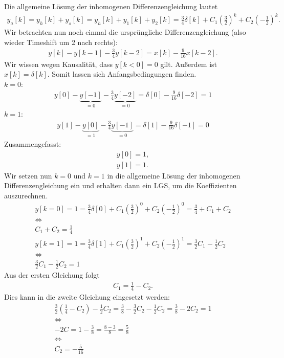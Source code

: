 \documentclass[11pt,a4paper,DIV=12]{scrartcl}
\begin{document}
Die allgemeine Lösung der inhomogenen Differenzengleichung lautet
\begin{gather}
	y_a[k]=y_h[k]+y_s[k]=y_h[k]+y_1[k]+y_2[k]=\frac{3}{4}\delta[k]+C_1\left(\frac{3}{2}\right)^k+C_2\left(-\frac{1}{2}\right)^k.
\end{gather}
Wir betrachten nun noch einmal die ursprüngliche Differenzengleichung (also wieder Timeshift um 2 nach rechts):
\begin{gather}
	y[k]-y[k-1]-\frac{3}{4}y[k-2]=x[k]-\frac{9}{16}x[k-2].
\end{gather}
Wir wissen wegen Kausalität, dass $y[k<0]=0$ gilt. Außerdem ist $x[k]=\delta[k]$. Somit lassen sich Anfangsbedingungen finden.\\
$k=0$:
\begin{gather}
	y[0]-\underbrace{y[-1]}_{=0}-\frac{3}{4}\underbrace{y[-2]}_{=0}=\delta[0]-\frac{9}{16}\delta[-2]=1
\end{gather}
$k=1$:
\begin{gather}
	y[1]-\underbrace{y[0]}_{=1}-\frac{3}{4}\underbrace{y[-1]}_{=0}=\delta[1]-\frac{9}{16}\delta[-1]=0
\end{gather}
Zusammengefasst:
\begin{gather}
	y[0]=1,\\
	y[1]=1.
\end{gather}
Wir setzen nun $k=0$ und $k=1$ in die allgemeine Lösung der inhomogenen Differenzengleichung ein und erhalten dann ein LGS, um die Koeffizienten auszurechnen.
\begin{gather}
	y[k=0]=1=\frac{3}{4}\delta[0]+C_1\left(\frac{3}{2}\right)^0+C_2\left(-\frac{1}{2}\right)^0=\frac{3}{4}+C_1+C_2\\
	\Longleftrightarrow\nonumber \\
	C_1+C_2=\frac{1}{4}\\
	y[k=1]=1=\frac{3}{4}\delta[1]+C_1\left(\frac{3}{2}\right)^1+C_2\left(-\frac{1}{2}\right)^1=\frac{3}{2}C_1-\frac{1}{2}C_2\\
	\Longleftrightarrow\nonumber\\
	\frac{3}{2}C_1-\frac{1}{2}C_2=1
\end{gather}
Aus der ersten Gleichung folgt 
\begin{gather}
	C_1=\frac{1}{4}-C_2.
\end{gather}
Dies kann in die zweite Gleichung eingesetzt werden:
\begin{gather}
	\frac{3}{2}(\frac{1}{4}-C_2)-\frac{1}{2}C_2=\frac{3}{8}-\frac{3}{2}C_2-\frac{1}{2}C_2=\frac{3}{8}-2C_2=1\\
	\Longleftrightarrow\\
	-2C=1-\frac{3}{8}=\frac{8-3}{8}=\frac{5}{8}\\
	\Longleftrightarrow\nonumber\\
	C_2=-\frac{5}{16}
\end{gather}
\end{document}
